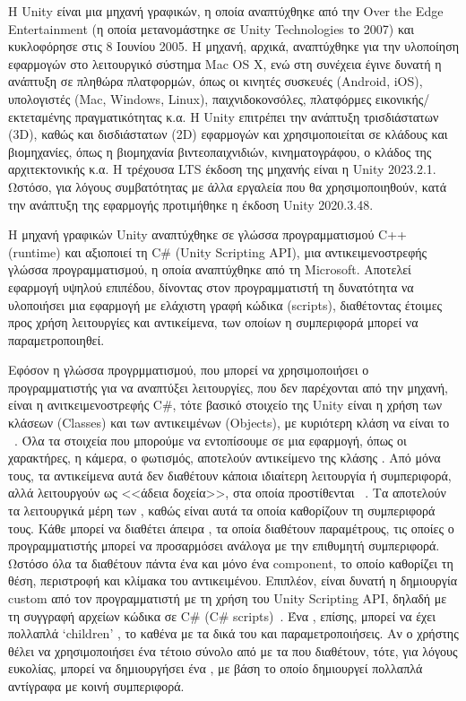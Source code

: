 Η Unity είναι μια μηχανή γραφικών, η οποία αναπτύχθηκε από την Over the Edge Entertainment (η οποία μετανομάστηκε σε Unity Technologies το 2007) και κυκλοφόρησε στις 8 Ιουνίου 2005. Η μηχανή, αρχικά, αναπτύχθηκε για την υλοποίηση εφαρμογών στο λειτουργικό σύστημα Mac OS X, ενώ στη συνέχεια έγινε δυνατή η ανάπτυξη σε πληθώρα πλατφορμών, όπως οι κινητές συσκευές (Android, iOS), υπολογιστές (Mac, Windows, Linux), παιχνιδοκονσόλες, πλατφόρμες εικονικής/εκτεταμένης πραγματικότητας κ.α. Η Unity επιτρέπει την ανάπτυξη τρισδιάστατων (3D), καθώς και δισδιάστατων (2D) εφαρμογών και χρησιμοποιείται σε κλάδους και βιομηχανίες, όπως η βιομηχανία βιντεοπαιχνιδιών, κινηματογράφου, ο κλάδος της αρχιτεκτονικής κ.α. Η τρέχουσα LTS έκδοση της μηχανής είναι η Unity 2023.2.1. Ωστόσο, για λόγους συμβατότητας με άλλα εργαλεία που θα χρησιμοποιηθούν, κατά την ανάπτυξη της εφαρμογής προτιμήθηκε η έκδοση Unity 2020.3.48.

Η μηχανή γραφικών Unity αναπτύχθηκε σε γλώσσα προγραμματισμού C++ (runtime) και αξιοποιεί τη C\# (Unity Scripting API), μια αντικειμενοστρεφής γλώσσα προγραμματισμού, η οποία αναπτύχθηκε από τη Microsoft. Αποτελεί εφαρμογή υψηλού επιπέδου, δίνοντας στον προγραμματιστή τη δυνατότητα να υλοποιήσει μια εφαρμογή με ελάχιστη γραφή κώδικα (scripts), διαθέτοντας έτοιμες προς χρήση λειτουργίες και αντικείμενα, των οποίων η συμπεριφορά μπορεί να παραμετροποιηθεί.

Εφόσον η γλώσσα προγρμματισμού, που μπορεί να χρησιμοποιήσει ο προγραμματιστής για να αναπτύξει λειτουργίες, που δεν παρέχονται από την μηχανή, είναι η ανιτκειμενοστρεφής C\#, τότε βασικό στοιχείο της Unity είναι η χρήση των κλάσεων (Classes) και των αντικειμένων (Objects), με κυριότερη κλάση να είναι το ~\cite{unitytechnologies_2023_gameobjects}. Όλα τα στοιχεία που μπορούμε να εντοπίσουμε σε μια εφαρμογή, όπως οι χαρακτήρες, η κάμερα, ο φωτισμός, αποτελούν αντικείμενο της κλάσης . Από μόνα τους, τα αντικείμενα αυτά δεν διαθέτουν κάποια ιδιαίτερη λειτουργία ή συμπεριφορά, αλλά λειτουργούν ως <<άδεια δοχεία>>, στα οποία προστίθενται ~\cite{unitytechnologies_2023_introduction}. Τα  αποτελούν τα λειτουργικά μέρη των , καθώς είναι αυτά τα οποία καθορίζουν τη συμπεριφορά τους. Κάθε  μπορεί να διαθέτει άπειρα , τα οποία διαθέτουν παραμέτρους, τις οποίες ο προγραμματιστής μπορεί να προσαρμόσει ανάλογα με την επιθυμητή συμπεριφορά. Ωστόσο όλα τα  διαθέτουν πάντα ένα και μόνο ένα  component, το οποίο καθορίζει τη θέση, περιστροφή και κλίμακα του αντικειμένου. Επιπλέον, είναι δυνατή η δημιουργία custom  από τον προγραμματιστή με τη χρήση του Unity Scripting API, δηλαδή με τη συγγραφή αρχείων κώδικα σε C\# (C\# scripts)~\cite{unitytechnologies_2023_creating}. Ένα , επίσης, μπορεί να έχει πολλαπλά `children' , το καθένα με τα δικά του  και παραμετροποιήσεις. Αν ο χρήστης θέλει να χρησιμοποιήσει ένα τέτοιο σύνολο από  με τα  που διαθέτουν, τότε, για λόγους ευκολίας, μπορεί να δημιουργήσει ένα , με βάση το οποίο δημιουργεί πολλαπλά αντίγραφα με κοινή συμπεριφορά.

